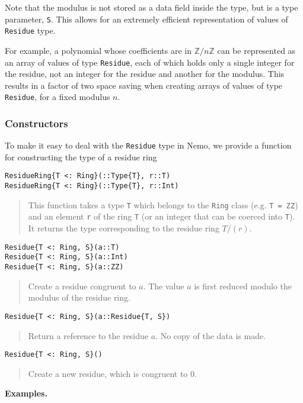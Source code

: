 \documentclass[a4paper,10pt]{article}
\newcommand{\Z}{\mathbb{Z}}
\newcommand{\code}{\lstinline}
\newcommand{\desc}[1]{\vspace{-3mm}\begin{quote}#1\end{quote}}
\begin{document}
{{Note that the modulus is not stored as a data field inside the type, but is
a type parameter, \code{S}. This allows for an extremely efficient 
representation of values of \code{Residue} type.

For example, a polynomial whose coefficients are in $\Z/n\Z$ can be 
represented as an array of values of type \code{Residue}, each of which holds
only a single integer for the residue, not an integer for the residue and
another for the modulus. This results in a factor of two space saving when
creating arrays of values of type \code{Residue}, for a fixed modulus $n$.

\subsubsection{Constructors}

To make it easy to deal with the \code{Residue} type in Nemo, we provide a
function for constructing the type of a residue ring

\begin{lstlisting}
ResidueRing{T <: Ring}(::Type{T}, r::T)
ResidueRing{T <: Ring}(::Type{T}, r::Int)
\end{lstlisting}

\desc{This function takes a type \code{T} which belongs to the \code{Ring}
class (e.g. \code{T = ZZ}) and an element \code{r} of the ring \code{T} (or
an integer that can be coerced into \code{T}). It returns the type 
corresponding to the residue ring $T/(r)$.}

\begin{lstlisting}
Residue{T <: Ring, S}(a::T)
Residue{T <: Ring, S}(a::Int)  
Residue{T <: Ring, S}(a::ZZ)  
\end{lstlisting}

\desc{Create a residue congruent to $a$. The value $a$ is first reduced
modulo the modulus of the residue ring.}

\begin{lstlisting}
Residue{T <: Ring, S}(a::Residue{T, S})  
\end{lstlisting}

\desc{Return a reference to the residue $a$. No copy of the data is made.}

\begin{lstlisting}
Residue{T <: Ring, S}()
\end{lstlisting}

\desc{Create a new residue, which is congruent to $0$.}

\textbf{Examples.}

}}
\end{document}
